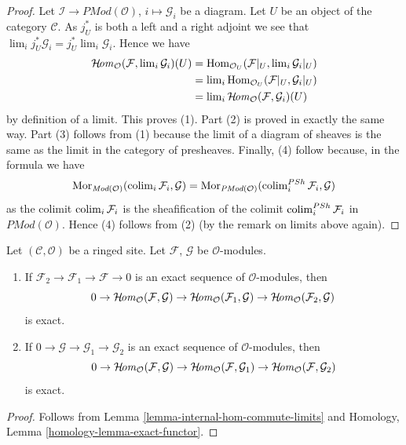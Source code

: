 \begin{proof}
Let $\mathcal{I} \to \textit{PMod}(\mathcal{O})$, $i \mapsto \mathcal{G}_i$
be a diagram. Let $U$ be an object of the category $\mathcal{C}$.
As $j_U^*$ is both a left and a right adjoint we see that
$\lim_i j_U^*\mathcal{G}_i = j_U^* \lim_i \mathcal{G}_i$.
Hence we have
\begin{align*}
\mathop{\mathcal{H}\!\mathit{om}}\nolimits_\mathcal{O}(\mathcal{F}, \mathop{\mathrm{lim}}\nolimits_i \mathcal{G}_i)(U)
& =
\mathop{\mathrm{Hom}}\nolimits_{\mathcal{O}_U}(\mathcal{F}|_U, \mathop{\mathrm{lim}}\nolimits_i \mathcal{G}_i|_U) \\
& =
\mathop{\mathrm{lim}}\nolimits_i \mathop{\mathrm{Hom}}\nolimits_{\mathcal{O}_U}(\mathcal{F}|_U, \mathcal{G}_i|_U) \\
& = \mathop{\mathrm{lim}}\nolimits_i \mathop{\mathcal{H}\!\mathit{om}}\nolimits_\mathcal{O}(\mathcal{F}, \mathcal{G}_i)(U)
\end{align*}
by definition of a limit. This proves (1). Part (2) is proved in exactly the
same way. Part (3) follows from (1) because the limit of a diagram of sheaves
is the same as the limit in the category of presheaves.
Finally, (4) follow because, in the formula we have
$$
\mathop{\mathrm{Mor}}\nolimits_{\textit{Mod}(\mathcal{O})}(
\mathop{\mathrm{colim}}\nolimits_i \mathcal{F}_i, \mathcal{G})
=
\mathop{\mathrm{Mor}}\nolimits_{\textit{PMod}(\mathcal{O})}(
\mathop{\mathrm{colim}}\nolimits^{PSh}_i \mathcal{F}_i, \mathcal{G})
$$
as the colimit $\mathop{\mathrm{colim}}\nolimits_i \mathcal{F}_i$ is the sheafification of
the colimit $\mathop{\mathrm{colim}}\nolimits^{PSh}_i \mathcal{F}_i$ in
$\textit{PMod}(\mathcal{O})$. Hence (4) follows from (2)
(by the remark on limits above again).
\end{proof}

\begin{lemma}
\label{lemma-internal-hom-exact}
Let $(\mathcal{C}, \mathcal{O})$ be a ringed site.
Let $\mathcal{F}$, $\mathcal{G}$ be $\mathcal{O}$-modules.
\begin{enumerate}
\item If $\mathcal{F}_2 \to \mathcal{F}_1 \to \mathcal{F} \to 0$
is an exact sequence of $\mathcal{O}$-modules, then
$$
0 \to
\mathop{\mathcal{H}\!\mathit{om}}\nolimits_\mathcal{O}(\mathcal{F}, \mathcal{G}) \to
\mathop{\mathcal{H}\!\mathit{om}}\nolimits_\mathcal{O}(\mathcal{F}_1, \mathcal{G}) \to
\mathop{\mathcal{H}\!\mathit{om}}\nolimits_\mathcal{O}(\mathcal{F}_2, \mathcal{G})
$$
is exact.
\item If $0 \to \mathcal{G} \to \mathcal{G}_1 \to \mathcal{G}_2$
is an exact sequence of $\mathcal{O}$-modules, then
$$
0 \to
\mathop{\mathcal{H}\!\mathit{om}}\nolimits_\mathcal{O}(\mathcal{F}, \mathcal{G}) \to
\mathop{\mathcal{H}\!\mathit{om}}\nolimits_\mathcal{O}(\mathcal{F}, \mathcal{G}_1) \to
\mathop{\mathcal{H}\!\mathit{om}}\nolimits_\mathcal{O}(\mathcal{F}, \mathcal{G}_2)
$$
is exact.
\end{enumerate}
\end{lemma}

\begin{proof}
Follows from Lemma \ref{lemma-internal-hom-commute-limits} and
Homology, Lemma \ref{homology-lemma-exact-functor}.
\end{proof}

